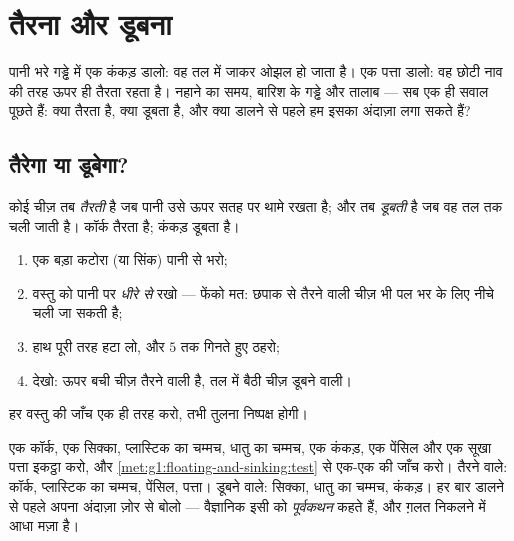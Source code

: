 \chapter{तैरना और डूबना}\label{ch:g1:floating-and-sinking}

पानी भरे गड्ढे में एक कंकड़ डालो: वह तल में जाकर ओझल हो जाता है। एक
पत्ता डालो: वह छोटी नाव की तरह ऊपर ही तैरता रहता है। नहाने का समय,
बारिश के गड्ढे और तालाब --- सब एक ही सवाल पूछते हैं: क्या तैरता है,
क्या डूबता है, और क्या डालने से पहले हम इसका अंदाज़ा लगा सकते हैं?

\section{तैरेगा या डूबेगा?}

\begin{definition}[तैरना और डूबना]\label{def:g1:floating-and-sinking:words}
कोई चीज़ तब \emph{तैरती} है जब पानी उसे ऊपर सतह पर थामे
रखता है; और तब \emph{डूबती} है जब वह तल तक चली जाती है।
कॉर्क तैरता है; कंकड़ डूबता है।
\end{definition}

\begin{method}[तैरने की निष्पक्ष जाँच]\label{met:g1:floating-and-sinking:test}
\begin{enumerate}
  \item एक बड़ा कटोरा (या सिंक) पानी से भरो;
  \item वस्तु को पानी पर \emph{धीरे से} रखो --- फेंको मत: छपाक से
        तैरने वाली चीज़ भी पल भर के लिए नीचे चली जा सकती है;
  \item हाथ पूरी तरह हटा लो, और $5$ तक गिनते हुए ठहरो;
  \item देखो: ऊपर बची चीज़ तैरने वाली है, तल में बैठी चीज़ डूबने
        वाली।
\end{enumerate}
हर वस्तु की जाँच एक ही तरह करो, तभी तुलना निष्पक्ष होगी।
\end{method}

\begin{example}[इसे करके देखो: छँटाई का खेल]\label{ex:g1:floating-and-sinking:sorting}
एक कॉर्क, एक सिक्का, प्लास्टिक का चम्मच, धातु का चम्मच, एक कंकड़, एक
पेंसिल और एक सूखा पत्ता इकट्ठा करो, और
\cref{met:g1:floating-and-sinking:test} से एक-एक की जाँच करो।
तैरने वाले: कॉर्क, प्लास्टिक का चम्मच, पेंसिल, पत्ता। डूबने वाले:
सिक्का, धातु का चम्मच, कंकड़। हर बार डालने से पहले अपना अंदाज़ा ज़ोर
से बोलो --- वैज्ञानिक इसी को \emph{पूर्वकथन} कहते हैं, और ग़लत निकलने
में आधा मज़ा है।
\end{example}

